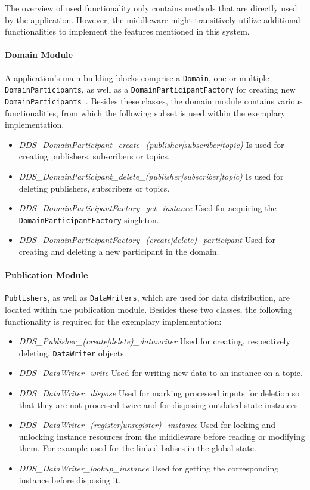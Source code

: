 The overview of used functionality only contains methods that are directly used by the application.
However, the middleware might transitively utilize additional functionalities to implement the features mentioned in this system.

\paragraph{Domain Module}
A  application's main building blocks comprise a \texttt{Domain}, one or multiple \texttt{DomainParticipants}, as well as a \texttt{DomainParticipantFactory} for creating new \texttt{DomainParticipants}~\cite{omgDDSspec}.
Besides these classes, the domain module contains various functionalities, from which the following subset is used within the exemplary implementation.

\begin{itemize}
\item \textit{DDS\_DomainParticipant\_create\_(publisher|subscriber|topic)} Is used for creating  publishers, subscribers or topics.
\item \textit{DDS\_DomainParticipant\_delete\_(publisher|subscriber|topic)} Is used for deleting  publishers, subscribers or topics.
\item \textit{DDS\_DomainParticipantFactory\_get\_instance} Used for acquiring the \texttt{DomainParticipantFactory} singleton.
\item \textit{DDS\_DomainParticipantFactory\_(create|delete)\_participant} Used for creating and deleting a new participant in the  domain.
\end{itemize}


\paragraph{Publication Module}
\texttt{Publishers}, as well as \texttt{DataWriters}, which are used for data distribution, are located within the publication module.
Besides these two classes, the following functionality is required for the exemplary implementation:

\begin{itemize}
\item \textit{DDS\_Publisher\_(create|delete)\_datawriter} Used for creating, respectively deleting, \texttt{DataWriter} objects.
\item \textit{DDS\_DataWriter\_write} Used for writing new data to an instance on a  topic.
\item \textit{DDS\_DataWriter\_dispose} Used for marking processed inputs for deletion so that they are not processed twice and for disposing outdated state instances.
\item \textit{DDS\_DataWriter\_(register|unregister)\_instance} Used for locking and unlocking instance resources from the middleware before reading or modifying them. For example used for the linked balises in the global state.
\item \textit{DDS\_DataWriter\_lookup\_instance} Used for getting the corresponding instance before disposing it.
\end{itemize}


